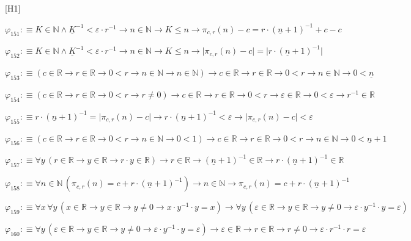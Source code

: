 \begin{fullproof}{[H1]}
\begin{abbrevlist}
\item $\varphi_{151} :\equiv K \in \mathbb{N} \land \underline{K}^{-1} < \varepsilon \cdot r^{-1} \to n \in \mathbb{N} \to K \leq n \to \pi_{c,r}(n) - c = r \cdot (\underline{n} + 1)^{-1} + c - c$
\item $\varphi_{152} :\equiv K \in \mathbb{N} \land \underline{K}^{-1} < \varepsilon \cdot r^{-1} \to n \in \mathbb{N} \to K \leq n \to \lvert \pi_{c,r}(n) - c \rvert = \lvert r \cdot (\underline{n} + 1)^{-1} \rvert$
\item $\varphi_{153} :\equiv (c \in \mathbb{R} \to r \in \mathbb{R} \to 0 < r \to n \in \mathbb{N} \to n \in \mathbb{N}) \to c \in \mathbb{R} \to r \in \mathbb{R} \to 0 < r \to n \in \mathbb{N} \to 0 < \underline{n}$
\item $\varphi_{154} :\equiv (c \in \mathbb{R} \to r \in \mathbb{R} \to 0 < r \to r \neq 0) \to c \in \mathbb{R} \to r \in \mathbb{R} \to 0 < r \to \varepsilon \in \mathbb{R} \to 0 < \varepsilon \to r^{-1} \in \mathbb{R}$
\item $\varphi_{155} :\equiv r \cdot (\underline{n} + 1)^{-1} = \lvert \pi_{c,r}(n) - c \rvert \to r \cdot (\underline{n} + 1)^{-1} < \varepsilon \to \lvert \pi_{c,r}(n) - c \rvert < \varepsilon$
\item $\varphi_{156} :\equiv (c \in \mathbb{R} \to r \in \mathbb{R} \to 0 < r \to n \in \mathbb{N} \to 0 < 1) \to c \in \mathbb{R} \to r \in \mathbb{R} \to 0 < r \to n \in \mathbb{N} \to 0 < \underline{n} + 1$
\item $\varphi_{157} :\equiv \forall y\,(r \in \mathbb{R} \to y \in \mathbb{R} \to r \cdot y \in \mathbb{R}) \to r \in \mathbb{R} \to (\underline{n} + 1)^{-1} \in \mathbb{R} \to r \cdot (\underline{n} + 1)^{-1} \in \mathbb{R}$
\item $\varphi_{158} :\equiv \forall n \in \mathbb{N}\,(\pi_{c,r}(n) = c + r \cdot (\underline{n} + 1)^{-1}) \to n \in \mathbb{N} \to \pi_{c,r}(n) = c + r \cdot (\underline{n} + 1)^{-1}$
\item $\varphi_{159} :\equiv \forall x\,\forall y\,(x \in \mathbb{R} \to y \in \mathbb{R} \to y \neq 0 \to x \cdot y^{-1} \cdot y = x) \to \forall y\,(\varepsilon \in \mathbb{R} \to y \in \mathbb{R} \to y \neq 0 \to \varepsilon \cdot y^{-1} \cdot y = \varepsilon)$
\item $\varphi_{160} :\equiv \forall y\,(\varepsilon \in \mathbb{R} \to y \in \mathbb{R} \to y \neq 0 \to \varepsilon \cdot y^{-1} \cdot y = \varepsilon) \to \varepsilon \in \mathbb{R} \to r \in \mathbb{R} \to r \neq 0 \to \varepsilon \cdot r^{-1} \cdot r = \varepsilon$

\end{abbrevlist}
\end{fullproof}
